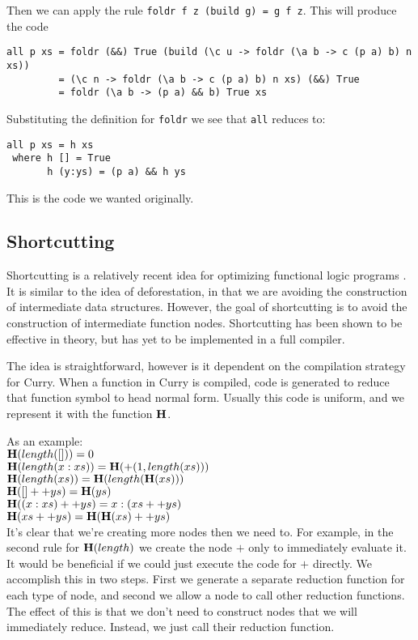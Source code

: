 Then we can apply the rule \texttt{foldr f z (build g) = g f z}.  This will produce the code
\begin{verbatim}
all p xs = foldr (&&) True (build (\c u -> foldr (\a b -> c (p a) b) n xs))
         = (\c n -> foldr (\a b -> c (p a) b) n xs) (&&) True 
         = foldr (\a b -> (p a) && b) True xs
\end{verbatim}
Substituting the definition for \texttt{foldr} we see that \texttt{all} reduces to:
\begin{verbatim}
all p xs = h xs
 where h [] = True
       h (y:ys) = (p a) && h ys
\end{verbatim}
This is the code we wanted originally.

\subsection{Shortcutting}
Shortcutting is a relatively recent idea for optimizing functional logic programs \cite{shortcutting}.
It is similar to the idea of deforestation, in that we are avoiding the construction of intermediate data structures.
However, the goal of shortcutting is to avoid the construction of intermediate function nodes.
Shortcutting has been shown to be effective in theory, but has yet to be implemented in a full compiler.

The idea is straightforward, however is it dependent on the compilation strategy for Curry.
When a function in Curry is compiled, code is generated to reduce that function symbol to head normal form.
Usually this code is uniform, and we represent it with the function $\mbox{\bf H}$.

\noindent
As an example:\\
$\mbox{\bf H}(length([])) = 0$\\
$\mbox{\bf H}(length(x:xs)) = \mbox{\bf H}(+(1,length(xs)))$\\
$\mbox{\bf H}(length(xs)) = \mbox{\bf H}(length(\mbox{\bf H}(xs)))$\\
$\mbox{\bf H}([]++ys) = \mbox{\bf H}(ys)$\\
$\mbox{\bf H}((x:xs)++ys) = x : (xs++ys)$\\
$\mbox{\bf H}(xs++ys) = \mbox{\bf H}(\mbox{\bf H}(xs) ++ ys)$\\

It's clear that we're creating more nodes then we need to.
For example, in the second rule for $\mbox{\bf H}(length)$ we create the node $+$ only to immediately evaluate it.
It would be beneficial if we could just execute the code for $+$ directly.
We accomplish this in two steps.
First we generate a separate reduction function for each type of node,
and second we allow a node to call other reduction functions.
The effect of this is that we don't need to construct nodes that we will immediately reduce.
Instead, we just call their reduction function.


